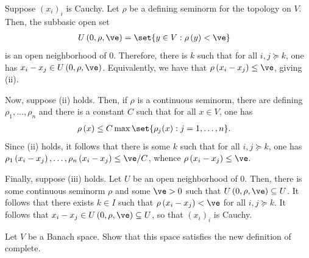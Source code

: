 \documentclass[10pt]{mypackage}
\begin{document}
\begin{solution}
  Suppose $\left( x_i \right)_i$ is Cauchy. Let $\rho$ be a defining seminorm for the topology on $V$. Then, the subbasic open set
  \begin{align*}
    U\left( 0,\rho,\ve  \right) &= \set{y\in V : \rho\left( y \right) < \ve}
  \end{align*}
  is an open neighborhood of $0$. Therefore, there is $k$ such that for all $i,j\succeq k$, one has $x_i-x_j\in U\left( 0,\rho,\ve \right)$. Equivalently, we have that $\rho\left( x_i-x_j \right) \leq \ve$, giving (ii).

  Now, suppose (ii) holds. Then, if $\rho$ is a continuous seminorm, there are defining $\rho_1,\dots,\rho_n$ and there is a constant $C$ such that for all $x\in V$, one has
  \begin{align*}
    \rho\left( x \right) &\leq C\max\set{\rho_j(x) : j=1,\dots,n}.
  \end{align*}
  Since (ii) holds, it follows that there is some $k$ such that for all $i,j\succeq k$, one has $\rho_1\left( x_i-x_j \right),\dots,\rho_n\left( x_i-x_j \right) \leq \ve/C$, whence $\rho\left( x_i-x_j \right) \leq \ve$.

  Finally, suppose (iii) holds. Let $U$ be an open neighborhood of $0$. Then, there is some continuous seminorm $\rho$ and some $\ve > 0$ such that $U\left( 0,\rho,\ve \right)\subseteq U$. It follows that there exists $k\in I$ such that $\rho\left( x_i-x_j \right) < \ve$ for all $i,j\succeq k$. It follows that $x_i-x_j\in U\left( 0,\rho,\ve \right)\subseteq U$, so that $\left( x_i \right)_i$ is Cauchy.
\end{solution}
\begin{problem}[Problem II.4]
  Let $V$ be a Banach space. Show that this space satisfies the new definition of complete.
\end{problem}
\end{document}

